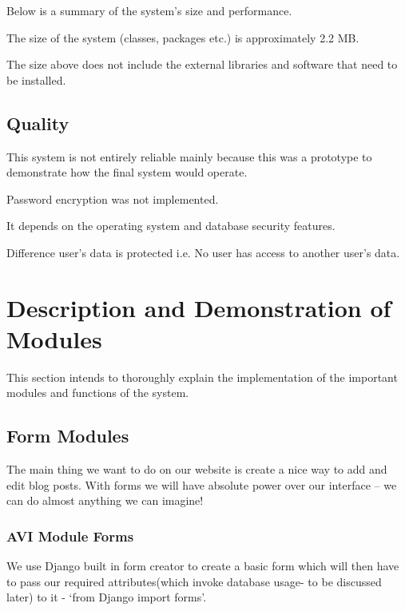 \documentclass[10pt]{article}
\begin{document}
Below is a summary of the system’s size and performance.

\begin{description}[font=$\bullet$~\normalfont\scshape\color{red!50!black}]
\item[] The size of the system (classes, packages etc.) is approximately 2.2 MB.
\item[] The size above does not include the external libraries and software that need to be installed.
\end{description}


\subsection{Quality}

This system is not entirely reliable mainly because this was a prototype to demonstrate how the final system would operate. 

\begin{description}[font=$\bullet$~\normalfont\scshape\color{red!50!black}]
\item[] Password encryption was not implemented.
\item[] It depends on the operating system and database security features.
\item[] Difference user’s data is protected i.e. No user has access to another user’s data.
\end{description}

\section{Description and Demonstration of Modules}
This section intends to thoroughly explain the implementation of the important modules and functions of the system.

\subsection{Form Modules}
The main thing we want to do on our website is create a nice way to add and edit blog posts. With forms we will have absolute power over our interface – we can do almost anything we can imagine!

\subsubsection{AVI Module Forms}
We use Django built in form creator to create a basic form which will then have to pass our required attributes(which invoke database usage- to be discussed later) to it - ‘from Django import forms’.
\end{document}
